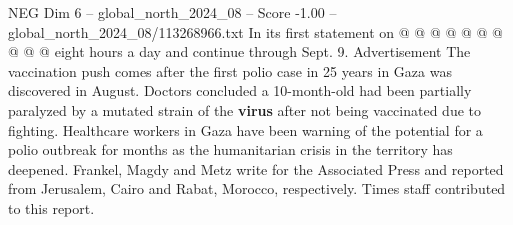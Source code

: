 \begin{textsample}{NEG Dim 6 – global\_north\_2024\_08 – Score -1.00 – global\_north\_2024\_08/113268966.txt}
In its first statement on @ @ @ @ @ @ @ @ @ @ eight hours a day and continue through Sept. 9.
Advertisement The vaccination push comes after the first polio case in 25 years in Gaza was discovered in August.
Doctors concluded a 10-month-old had been partially paralyzed by a mutated strain of the \textbf{virus} after not being vaccinated due to fighting.
Healthcare workers in Gaza have been warning of the potential for a polio outbreak for months as the humanitarian crisis in the territory has deepened.
Frankel, Magdy and Metz write for the Associated Press and reported from Jerusalem, Cairo and Rabat, Morocco, respectively.
Times staff contributed to this report.

\end{textsample}
